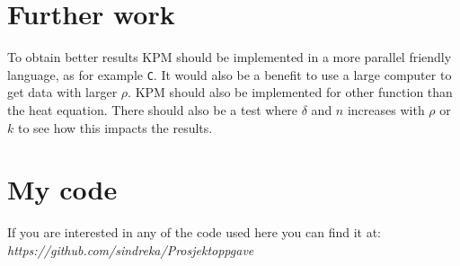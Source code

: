 \chapter*{Further work}%
To obtain better results KPM should be implemented in a more parallel friendly language, as for example \texttt{C}. It would also be a benefit to use a large computer to get data with larger $\rho$.
KPM should also be implemented for other function than the heat equation. 
There should also be a test where $\delta$ and $ n $ increases with $\rho$ or $k$ to see how this impacts the results.
\chapter*{My code}%

If you are interested in any of the code used here you can find it at: \\
\emph{https://github.com/sindreka/Prosjektoppgave}




